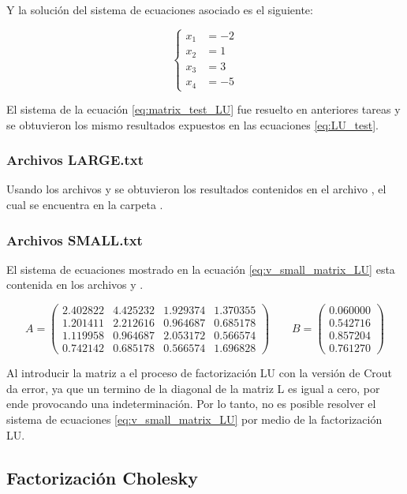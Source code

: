 Y la solución del sistema de ecuaciones asociado es el siguiente:

\begin{equation}
    \begin{cases}
        x_1 & = -2 \\
        x_2 & = 1  \\
        x_3 & = 3  \\
        x_4 & = -5
    \end{cases}
    \label{eq:LU_test}
\end{equation}

El sistema de la ecuación \ref{eq:matrix_test_LU} fue resuelto en anteriores tareas y se obtuvieron los mismo resultados expuestos en las ecuaciones \ref{eq:LU_test}.

\subsubsection{Archivos LARGE.txt}

Usando los archivos  y  se obtuvieron los resultados contenidos en el archivo , el cual se encuentra en la carpeta .
\subsubsection{Archivos SMALL.txt}

El sistema de ecuaciones mostrado en la ecuación \ref{eq:v_small_matrix_LU} esta contenida en los archivos  y .

\begin{equation}
    A= \begin{pmatrix}
        2.402822 & 4.425232 & 1.929374 & 1.370355 \\
        1.201411 & 2.212616 & 0.964687 & 0.685178 \\
        1.119958 & 0.964687 & 2.053172 & 0.566574 \\
        0.742142 & 0.685178 & 0.566574 & 1.696828
    \end{pmatrix} \qquad
    B = \begin{pmatrix}
        0.060000 \\
        0.542716 \\
        0.857204 \\
        0.761270
    \end{pmatrix}
    \label{eq:v_small_matrix_LU}
\end{equation}

Al introducir la matriz a el proceso de factorización LU con la versión de Crout da error, ya que un termino de la diagonal de la matriz L es igual a cero, por ende provocando una indeterminación. Por lo tanto, no es posible resolver el sistema de ecuaciones \ref{eq:v_small_matrix_LU} por medio de la factorización LU.


\subsection{Factorización Cholesky}

